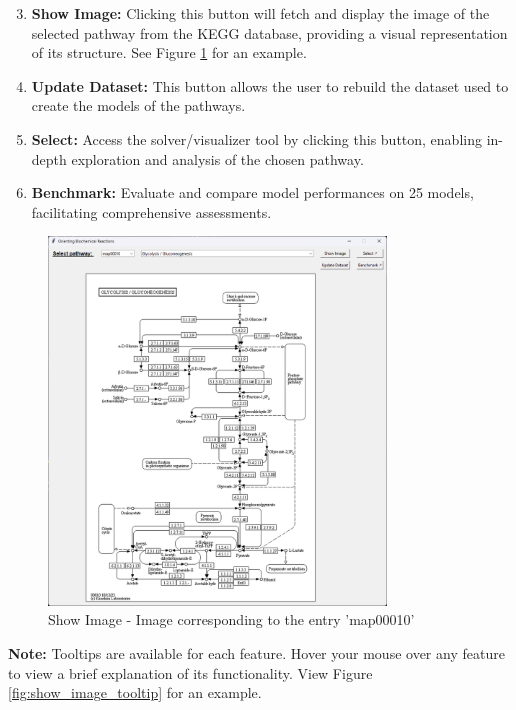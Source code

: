\begin{enumerate} 
\setcounter{enumi}{2}   

    \item \textbf{Show Image:} Clicking this button will fetch and display the image of the selected pathway from the KEGG database, providing a visual representation of its structure. See Figure \ref{fig:show_image} for an example.

    \item \textbf{Update Dataset:} This button allows the user to rebuild the dataset used to create the models of the pathways.
    
    \item \textbf{Select:} Access the solver/visualizer tool by clicking this button, enabling in-depth exploration and analysis of the chosen pathway.
    
    \item \textbf{Benchmark:} Evaluate and compare model performances on 25 models, facilitating comprehensive assessments.
\end{enumerate}

\begin{figure}[H]
    \centering
    \includegraphics[width=0.8\textwidth]{Design of the User Interface/image_pathway.png}
    \caption{Show Image - Image corresponding to the entry 'map00010'}
    \label{fig:show_image}
\end{figure}

\textbf{Note:} Tooltips are available for each feature. Hover your mouse over any feature to view a brief explanation of its functionality. View Figure \ref{fig:show_image_tooltip} for an example.

